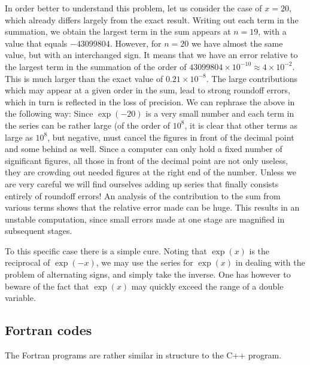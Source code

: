 In order better to understand this problem, let us consider the 
case of $x=20$, which already differs largely from the exact result.
Writing out each term in the summation, we obtain the largest
term in the sum appears at $n=19$, with a value that  equals $-43099804$.
However, for $n=20$ we have almost the same value, but with an interchanged
sign. It means that we
have an error relative to the largest term in the summation of the order
of $43099804\times 10^{-10}\approx 4\times10^{-2}$. 
This is much larger than the exact value of $0.21\times 10^{-8}$.
The large contributions which may appear at a given order in the sum,
lead to strong roundoff errors, which in turn is reflected in the loss
of precision.  
We can rephrase the above in the following way: Since
$\exp{(-20)}$ is a very small number and each term in the series can be rather
large (of the order of $10^{8}$, it is clear that other terms as large
as $10^{8}$, but negative, must cancel the figures in front of the decimal
point and some behind as well. Since a computer can only hold a fixed number of
significant figures, all those in front of the decimal point are not
only useless,
they are crowding out needed figures at the right end of the number.
Unless we are very careful we will find ourselves adding up series that
finally consists entirely of roundoff errors!
An analysis of the 
contribution to the sum from various terms shows that the relative
error made can be huge. This results in an unstable computation, since small
errors made at one stage are magnified in subsequent stages.


To this specific case there is a simple cure. Noting that $\exp{(x)}$ is the 
reciprocal of $\exp{(-x)}$, we may use the series for $\exp{(x)}$ 
in dealing with
the problem of alternating signs, and simply take the inverse. 
One has however to beware of the fact that 
$\exp{(x)}$ may quickly  exceed the range of a double
variable.





\subsection{Fortran codes}




The Fortran  programs are  rather similar in structure to the C++ program. 


